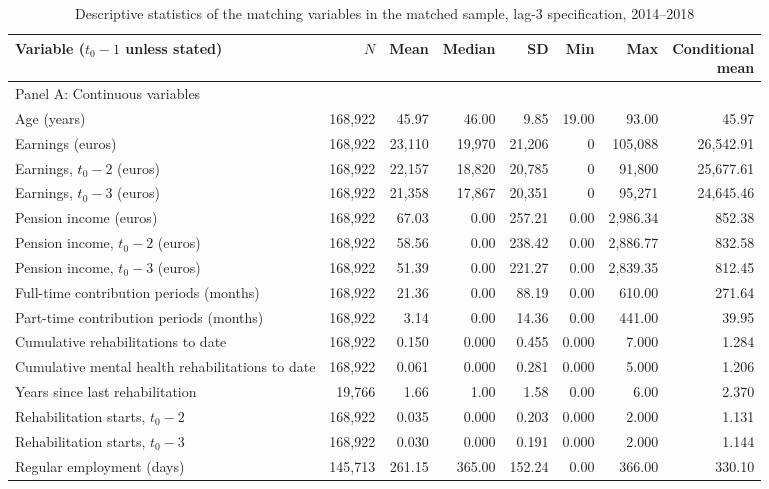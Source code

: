 \documentclass[a4paper,12pt]{article}
\theoremstyle{plain}
\theoremstyle{definition}
\theoremstyle{TheoremNum}
\theoremstyle{CorollaryNum}
\theoremstyle{PropositionNum}
\theoremstyle{TheoremNum}
\begin{document}
\begin{table}[H]
\centering
\caption{Descriptive statistics of the matching variables in the matched sample, lag-3 specification, 2014--2018}
\label{tab:descriptive_lag3}
\small
\begin{adjustbox}{max width=\textwidth}
\begin{tabular}{lrrrrrrr}
\toprule
Variable ($t_0-1$ unless stated)
& $N$ & Mean & Median & SD & Min & Max
& \shortstack{Conditional\\mean} \\
\midrule
\multicolumn{8}{l}{Panel A: Continuous variables} \\ \hline
Age (years)
& 168,922 & 45.97 & 46.00 & 9.85 & 19.00 & 93.00 & 45.97 \\
Earnings (euros)
& 168,922 & 23,110 & 19,970 & 21,206 & 0 & 105,088 & 26,542.91 \\
Earnings, $t_0-2$ (euros)
& 168,922 & 22,157 & 18,820 & 20,785 & 0 & 91,800 & 25,677.61 \\
Earnings, $t_0-3$ (euros)
& 168,922 & 21,358 & 17,867 & 20,351 & 0 & 95,271 & 24,645.46 \\
Pension income (euros)
& 168,922 & 67.03 & 0.00 & 257.21 & 0.00 & 2,986.34 & 852.38 \\
Pension income, $t_0-2$ (euros)
& 168,922 & 58.56 & 0.00 & 238.42 & 0.00 & 2,886.77 & 832.58 \\
Pension income, $t_0-3$ (euros)
& 168,922 & 51.39 & 0.00 & 221.27 & 0.00 & 2,839.35 & 812.45 \\
Full-time contribution periods (months)
& 168,922 & 21.36 & 0.00 & 88.19 & 0.00 & 610.00 & 271.64 \\
Part-time contribution periods (months)
& 168,922 & 3.14 & 0.00 & 14.36 & 0.00 & 441.00 & 39.95 \\
Cumulative rehabilitations to date
& 168,922 & 0.150 & 0.000 & 0.455 & 0.000 & 7.000 & 1.284 \\
Cumulative mental health rehabilitations to date
& 168,922 & 0.061 & 0.000 & 0.281 & 0.000 & 5.000 & 1.206 \\
Years since last rehabilitation
& 19,766 & 1.66 & 1.00 & 1.58 & 0.00 & 6.00 & 2.370 \\
Rehabilitation starts, $t_0-2$
& 168,922 & 0.035 & 0.000 & 0.203 & 0.000 & 2.000 & 1.131 \\
Rehabilitation starts, $t_0-3$
& 168,922 & 0.030 & 0.000 & 0.191 & 0.000 & 2.000 & 1.144 \\
Regular employment (days)
& 145,713 & 261.15 & 365.00 & 152.24 & 0.00 & 366.00 & 330.10 \\

\end{tabular}
\end{adjustbox}
\end{table}
\end{document}
